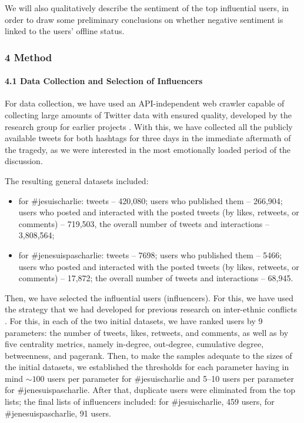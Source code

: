 We will also qualitatively describe the sentiment of the top influential users, in order to draw some preliminary conclusions on whether negative sentiment is linked to the users’ offline status.

\subsubsection{4 Method}

\paragraph{4.1 Data Collection and Selection of Influencers} For data collection, we have used an API-independent web crawler capable of collecting large amounts of Twitter data with ensured quality, developed by the research group for earlier projects \cite{BlekanovSergeevMartynenko,BodrunovaLitvinenkoBlekanov2016}. With this, we have collected all the publicly available tweets for both hashtags for three days in the immediate aftermath of the tragedy, as we were interested in the most emotionally loaded period of the discussion.

The resulting general datasets included:
\begin{itemize}
	\item for \#jesuischarlie: tweets -- 420,080; users who published them -- 266,904; users who posted and interacted with the posted tweets (by likes, retweets, or comments) -- 719,503, the overall number of tweets and interactions -- 3,808,564;
	
	\item for \#jenesuispascharlie: tweets -- 7698; users who published them -- 5466; users who posted and interacted with the posted tweets (by likes, retweets, or comments) -- 17,872; the overall number of tweets and interactions -- 68,945.
\end{itemize}

Then, we have selected the influential users (influencers). For this, we have used the strategy that we had developed for previous research on inter-ethnic conflicts \cite{BodrunovaLitvinenkoBlekanov2017,BodrunovaLitvinenkoBlekanov}. For this, in each of the two initial datasets, we have ranked users by 9 parameters: the number of tweets, likes, retweets, and comments, as well as by five centrality metrics, namely in-degree, out-degree, cumulative degree, betweenness, and pagerank. Then, to make the samples adequate to the sizes of the initial datasets, we established the thresholds for each parameter having in mind \(\sim100\) users per parameter for \#jesuischarlie and 5--10 users per parameter for \#jenesuispascharlie. After that, duplicate users were eliminated from the top lists; the final lists of influencers included: for \#jesuischarlie, 459 users, for \#jenesuispascharlie, 91 users.

